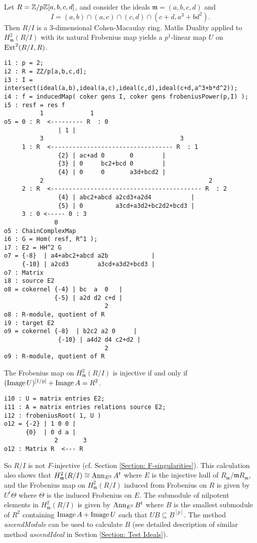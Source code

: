 \documentclass{amsart}
\begin{document}
\begin{example}
Let $R=\mbox{$\mathbb{Z}$}/p\mbox{$\mathbb{Z}$}[a,b,c,d]$, and consider the ideals $\mathfrak{m}=(a,b,c,d)$ and
$$I= (a,b) \cap (a,c) \cap (c,d) \cap (c+d, a^3+b d^2).$$
Then $R/I$ is a $3$-dimensional Cohen-Macaulay ring.
Matlis Duality applied to $H^2_{\mathfrak{m}} (R/I)$ with its natural Frobenius map
yields a $p^1$-linear map $U$ on $\operatorname{Ext}^2(R/ I, R)$.

\medskip
{\small
\begin{verbatim}
i1 : p = 2;
i2 : R = ZZ/p[a,b,c,d];
i3 : I = intersect(ideal(a,b),ideal(a,c),ideal(c,d),ideal(c+d,a^3+b*d^2));
i4 : f = inducedMap( coker gens I, coker gens frobeniusPower(p,I) );
i5 : resf = res f
          1             1
o5 = 0 : R  <--------- R  : 0
               | 1 |
          3                                      3
     1 : R  <---------------------------------- R  : 1
               {2} | ac+ad 0       0        |
               {3} | 0     bc2+bcd 0        |
               {4} | 0     0       a3d+bcd2 |
          2                                              2
     2 : R  <------------------------------------------ R  : 2
               {4} | abc2+abcd a2cd3+a2d4           |
               {5} | 0         a3cd+a3d2+bc2d2+bcd3 |
     3 : 0 <----- 0 : 3
              0
o5 : ChainComplexMap
i6 : G = Hom( resf, R^1 );
i7 : E2 = HH^2 G
o7 = {-8}  | a4+abc2+abcd a2b            |
     {-10} | a2cd3        a3cd+a3d2+bcd3 |
o7 : Matrix
i8 : source E2
o8 = cokernel {-4} | bc  a  0   |
              {-5} | a2d d2 c+d |
                            2
o8 : R-module, quotient of R
i9 : target E2
o9 = cokernel {-8}  | b2c2 a2 0     |
               {-10} | a4d2 d4 c2+d2 |
                            2
o9 : R-module, quotient of R
\end{verbatim}
}
\medskip

The Frobenius map on $H^2_{\mathfrak{m}} (R/I)$ is injective if and only if
$(\operatorname{Image} U)^{[1/p]}+\operatorname{Image} A=R^2$.

\medskip
\begin{verbatim}
i10 : U = matrix entries E2;
i11 : A = matrix entries relations source E2;
i12 : frobeniusRoot( 1, U )
o12 = {-2} | 1 0 0 |
      {0}  | 0 d a |
              2       3
o12 : Matrix R  <--- R
\end{verbatim}
\medskip

So $R/I$ is not $F$-injective (cf. Section \ref{Section: F-singularities}).
This calculation also shows that $H^2_{\mathfrak{m}} (R/I)\cong \operatorname{{Ann}}_{E^2} A^t$
where $E$ is the injective hull of $R_{\mathfrak{m}}/ {\mathfrak{m}} R_{\mathfrak{m}}$,
and the Frobenius map on  $H^2_{\mathfrak{m}} (R/I)$ induced from Frobenius on $R$
is given by $U^t \Theta$ where $\Theta$ is the induced Frobenius on $E$.
The submodule of nilpotent elements in  $H^2_{\mathfrak{m}} (R/I)$ is
given by $\operatorname{{Ann}}_{E^2} B^t$ where $B$ is the smallest submodule of $R^2$ containing $\operatorname{Image} A + \operatorname{Image} U$ such that $U  B \subseteq B^{[p]}$.
The method \emph{ascendModule} can be used to calculate  $B$ (see detailed description of similar method \emph{ascendIdeal} in Section \ref{Section: Test Ideals}).


\end{example}
\end{document}
